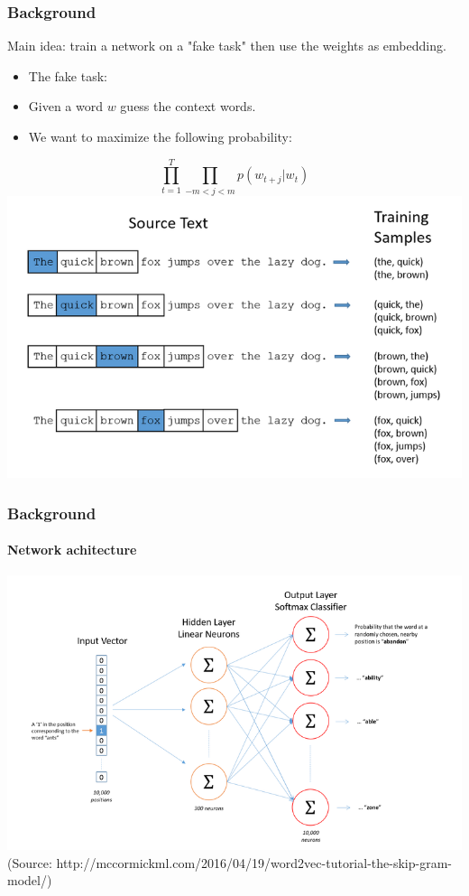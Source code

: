 \begin{frame}\frametitle{Background}
Main idea: train a network on a "fake task" then use the weights as embedding. \bigskip
\begin{itemize}
\item The fake task:
\item Given a word $w$ guess the context words. 
\item We want to maximize the following probability:
\end{itemize}
\begin{equation}
\prod_{t=1}^T \prod_{-m<j<m}  p(w_{t+j}|w_t)
\end{equation}
\includegraphics[scale=0.37]{images/context_pairs.png}
\end{frame}

\begin{frame}\frametitle{Background}\framesubtitle{Network achitecture}
\includegraphics[scale=0.37]{images/ntw_architecture.png}
(Source: http://mccormickml.com/2016/04/19/word2vec-tutorial-the-skip-gram-model/) 
\end{frame}

